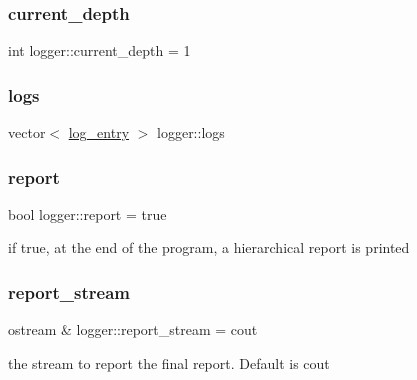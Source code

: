 \subsubsection{\texorpdfstring{current\+\_\+depth}{current\_depth}}
{\footnotesize\ttfamily int logger\+::current\+\_\+depth = 1\hspace{0.3cm}{\ttfamily [static]}}

\mbox{\label{classlogger_a46e89697a97bc41a90ec78763bfe4d39}} 
\subsubsection{\texorpdfstring{logs}{logs}}
{\footnotesize\ttfamily vector$<$ \hyperlink{classlog__entry}{log\+\_\+entry} $>$ logger\+::logs\hspace{0.3cm}{\ttfamily [static]}}

\mbox{\label{classlogger_adbcc380b0ef53e23125f91e1c8f13f4e}} 
\subsubsection{\texorpdfstring{report}{report}}
{\footnotesize\ttfamily bool logger\+::report = true\hspace{0.3cm}{\ttfamily [static]}}



if true, at the end of the program, a hierarchical report is printed 

\mbox{\label{classlogger_a8490b3400a43c9c6f3cc3cc122f10996}} 
\subsubsection{\texorpdfstring{report\+\_\+stream}{report\_stream}}
{\footnotesize\ttfamily ostream \& logger\+::report\+\_\+stream = cout\hspace{0.3cm}{\ttfamily [static]}}



the stream to report the final report. Default is cout 

\mbox{\label{classlogger_aab3c778c044ddf4b1b5fad8f4c230ff9}} 
